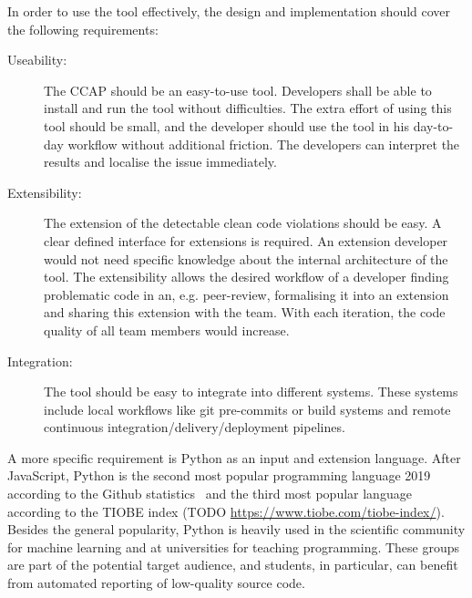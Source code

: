 In order to use the tool effectively, the design and implementation should cover the following requirements:
\begin{description}
    \item[Useability:]  The CCAP should be an easy-to-use tool. Developers shall be able to install and run the tool without difficulties. The extra effort of using this tool should be small, and the developer should use the tool in his day-to-day workflow without additional friction. The developers can interpret the results and localise the issue immediately.
    \item[Extensibility:] The extension of the detectable clean code violations should be easy. A clear defined interface for extensions is required. An extension developer would not need specific knowledge about the internal architecture of the tool. The extensibility allows the desired workflow of a developer finding problematic code in an, e.g. peer-review, formalising it into an extension and sharing this extension with the team. With each iteration, the code quality of all team members would increase.
    \item[Integration:] The tool should be easy to integrate into different systems. These systems include local workflows like git pre-commits or build systems and remote continuous integration/delivery/deployment pipelines.
\end{description}
A more specific requirement is Python as an input and extension language. After JavaScript, Python is the second most popular programming language 2019 according to the Github statistics~\cite{github_inc_state_2019} and the third most popular language according to the TIOBE index (TODO \url{https://www.tiobe.com/tiobe-index/}). Besides the general popularity, Python is heavily used in the scientific community for machine learning and at universities for teaching programming. These groups are part of the potential target audience, and students, in particular, can benefit from automated reporting of low-quality source code.

